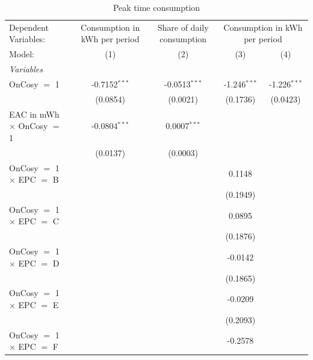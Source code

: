
\begin{table}[htbp]
   \caption{\label{tab:did-hetero} Peak time consumption}
   \centering
   \begin{tabular}{lcccc}
      \tabularnewline \midrule \midrule
      Dependent Variables: & Consumption in kWh per period & Share of daily consumption & \multicolumn{2}{c}{Consumption in kWh per period}\\
      Model:                                  & (1)             & (2)             & (3)            & (4)\\  
      \midrule
      \emph{Variables}\\
      OnCosy $=$ 1                            & -0.7152$^{***}$ & -0.0513$^{***}$ & -1.246$^{***}$ & -1.226$^{***}$\\   
                                              & (0.0854)        & (0.0021)        & (0.1736)       & (0.0423)\\   
      EAC in mWh $\times$ OnCosy $=$ 1        & -0.0804$^{***}$ & 0.0007$^{***}$  &                &   \\   
                                              & (0.0137)        & (0.0003)        &                &   \\   
      OnCosy $=$ 1 $\times$ EPC $=$ B         &                 &                 & 0.1148         &   \\   
                                              &                 &                 & (0.1949)       &   \\   
      OnCosy $=$ 1 $\times$ EPC $=$ C         &                 &                 & 0.0895         &   \\   
                                              &                 &                 & (0.1876)       &   \\   
      OnCosy $=$ 1 $\times$ EPC $=$ D         &                 &                 & -0.0142        &   \\   
                                              &                 &                 & (0.1865)       &   \\   
      OnCosy $=$ 1 $\times$ EPC $=$ E         &                 &                 & -0.0209        &   \\   
                                              &                 &                 & (0.2093)       &   \\   
      OnCosy $=$ 1 $\times$ EPC $=$ F         &                 &                 & -0.2578        &   \\   

\end{tabular}
\end{table}
